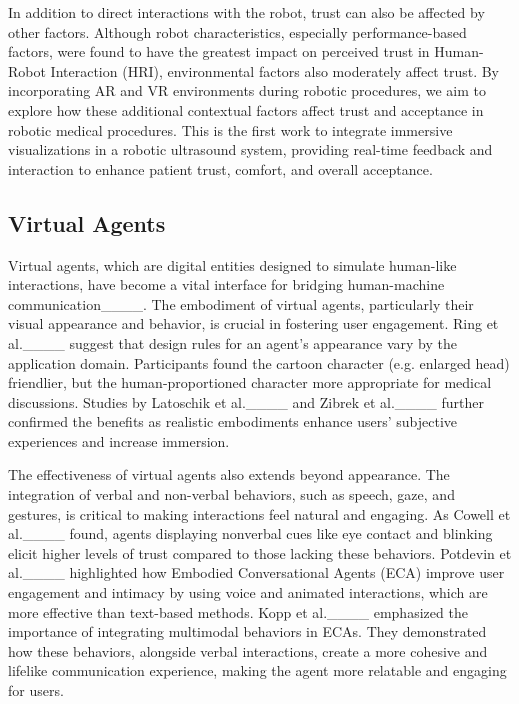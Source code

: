 In addition to direct interactions with the robot, trust can also be affected by other factors.   Although robot characteristics, especially performance-based factors, were found to have the greatest impact on perceived trust in Human-Robot Interaction (HRI), environmental factors also moderately affect trust. By incorporating AR and VR environments during robotic procedures, we aim to explore how these additional contextual factors affect trust and acceptance in robotic medical procedures. This is the first work to integrate immersive visualizations in a robotic ultrasound system, providing real-time feedback and interaction to enhance patient trust, comfort, and overall acceptance.

\subsection{Virtual Agents}

Virtual agents, which are digital entities designed to simulate human-like interactions, have become a vital interface for bridging human-machine communication____. The embodiment of virtual agents, particularly their visual appearance and behavior, is crucial in fostering user engagement. Ring et al.____ suggest that design rules for an agent's appearance vary by the application domain. Participants found the cartoon character (e.g. enlarged head) friendlier, but the human-proportioned character more appropriate for medical discussions. Studies by Latoschik et al.____ and Zibrek et al.____ further confirmed the benefits as realistic embodiments enhance users’ subjective experiences and increase immersion.

The effectiveness of virtual agents also extends beyond appearance. The integration of verbal and non-verbal behaviors, such as speech, gaze, and gestures, is critical to making interactions feel natural and engaging. As Cowell et al.____ found, agents displaying nonverbal cues like eye contact and blinking elicit higher levels of trust compared to those lacking these behaviors. Potdevin et al.____ highlighted how Embodied Conversational Agents (ECA) improve user engagement and intimacy by using voice and animated interactions, which are more effective than text-based methods. Kopp et al.____ emphasized the importance of integrating multimodal behaviors in ECAs. They demonstrated how these behaviors, alongside verbal interactions, create a more cohesive and lifelike communication experience, making the agent more relatable and engaging for users. 
 
